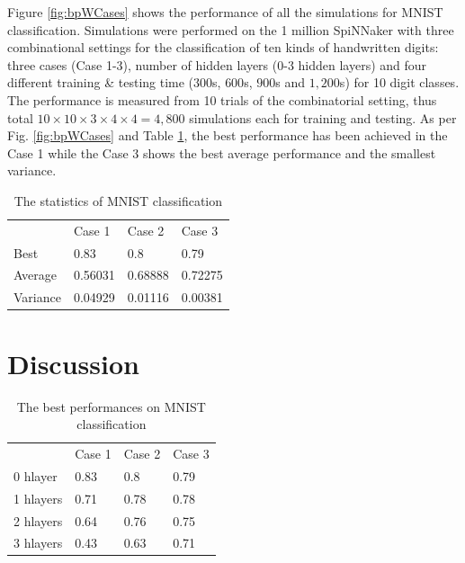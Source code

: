 \documentclass[preprint,12pt]{elsarticle}
\begin{document}
Figure \ref{fig:bpWCases} shows the performance of all the simulations for MNIST classification.
Simulations were performed on the 1 million SpiNNaker \cite{brown2018spinnaker} with three combinational settings for the classification of ten kinds of handwritten digits: three cases (Case 1-3), number of hidden layers (0-3 hidden layers) and four different training \& testing time ($300$s, $600$s, $900$s and $1,200$s) for 10 digit classes. 
The performance is measured from 10 trials of the combinatorial setting, thus total $10 \times 10 \times 3 \times 4 \times 4 = 4,800$ simulations each for training and testing. 
As per Fig. \ref{fig:bpWCases} and Table \ref{tab:sim_stat}, the best performance has been achieved in the Case 1 while the Case 3 shows the best average performance and the smallest variance. 

\setlength{\tabcolsep}{4pt}
\begin{table}
\setlength{\tabcolsep}{12pt} %
\begin{center}
\caption{The statistics of MNIST classification}
\label{tab:sim_stat}
\begin{tabular}{ llll }
\hline\noalign{\smallskip}
     ~          & Case 1    & Case 2    & Case 3    \\ 
\noalign{\smallskip}
\hline
\noalign{\smallskip}    
    Best 	    & 0.83	    & 0.8 	    & 0.79      \\ %
    Average 	& 0.56031	& 0.68888 	& 0.72275   \\ %
    Variance 	& 0.04929	& 0.01116	& 0.00381   \\ %
\hline
\end{tabular}
\end{center}
\end{table}
\setlength{\tabcolsep}{1.4pt}

\section{Discussion}
% 

\setlength{\tabcolsep}{4pt}
\begin{table}
\setlength{\tabcolsep}{12pt} %
\begin{center}
\caption{The best performances on MNIST classification}
\label{tab:sim_best}
\begin{tabular}{ llll }
\hline\noalign{\smallskip}
     ~          & Case 1    & Case 2    & Case 3    \\ 
\noalign{\smallskip}
\hline
\noalign{\smallskip}    
    0 hlayer 	& 0.83	    & 0.8	    & 0.79   \\
    1 hlayers 	& 0.71  	& 0.78   	& 0.78   \\
    2 hlayers	& 0.64  	& 0.76  	& 0.75   \\
    3 hlayers 	& 0.43  	& 0.63  	& 0.71   \\
\hline
\end{tabular}
\end{center}
\end{table}
\setlength{\tabcolsep}{1.4pt}
\end{document}
